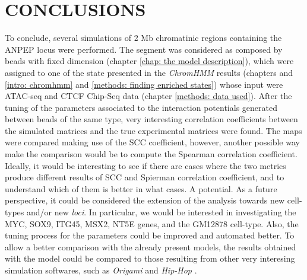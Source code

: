 \section{CONCLUSIONS}
To conclude, several simulations of 2 Mb chromatinic regions containing the ANPEP locus were performed. The segment was considered as composed by beads with fixed dimension (chapter \ref{chap: the model description}), which were assigned to one of the state presented in the \textit{ChromHMM} results (chapters and \ref{intro: chromhmm} and \ref{methods: finding enriched states}) whose input were ATAC-seq and CTCF Chip-Seq data (chapter \ref{methods: data used}). After the tuning of the parameters associated to the interaction potentials generated between beads of the same type, very interesting correlation coefficients between the simulated matrices and the true experimental matrices were found. %
The maps were compared making use of the SCC coefficient, however, another possible way make the comparison would be to compute the Spearman correlation coefficient. Ideally, it would be interesting to see if there are cases where the two metrics produce different results of SCC and Spierman correlation coefficient, and to understand which of them is better in what cases.
A potential.
As a future perspective, it could be considered the extension of the analysis towards new cell-types and/or new \textit{loci}. In particular, we would be interested in investigating the MYC, SOX9, ITG45, MSX2, NT5E genes, and the GM12878 cell-type. Also, the tuning process for the parameters could be improved and automated better.
To allow a better comparison with the already present models, the results obtained with the model could be compared to those resulting from other very interesing simulation softwares, such as \textit{Origami} and \textit{Hip-Hop}
\cite{bucklePolymerSimulationsHeteromorphic2018,tanCelltypespecificPrediction3D2023}.





